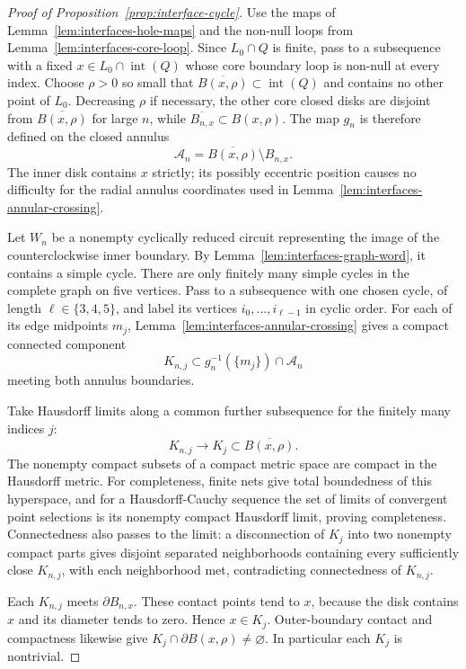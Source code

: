 \begin{proof}[Proof of Proposition~\ref{prop:interface-cycle}]
Use the maps of Lemma~\ref{lem:interfaces-hole-maps} and the
non-null loops from Lemma~\ref{lem:interfaces-core-loop}.
Since $L_0\cap Q$ is finite, pass to a subsequence with a fixed
$x\in L_0\cap\operatorname{int}(Q)$ whose core boundary loop
is non-null at every index.  Choose $\rho>0$ so small that
$\overline{B(x,\rho)}\subset\operatorname{int}(Q)$ and contains no
other point of $L_0$.  Decreasing $\rho$ if necessary, the other
core closed disks are disjoint from $\overline{B(x,\rho)}$ for
large $n$, while
$\overline{B_{n,x}}\subset B(x,\rho)$.  The map $g_n$ is therefore
defined on the closed annulus
\[
 \mathcal A_n=\overline{B(x,\rho)}\setminus B_{n,x}.
\]
The inner disk contains $x$ strictly; its possibly eccentric
position causes no difficulty for the radial annulus coordinates
used in Lemma~\ref{lem:interfaces-annular-crossing}.

Let $W_n$ be a nonempty cyclically reduced circuit representing the
image of the counterclockwise inner boundary.  By
Lemma~\ref{lem:interfaces-graph-word}, it contains a simple cycle.
There are only finitely many simple cycles in the complete graph
on five vertices.  Pass to a subsequence with one chosen cycle,
of length $\ell\in\{3,4,5\}$, and label its vertices
$i_0,\ldots,i_{\ell-1}$ in cyclic order.  For each of its edge
midpoints $m_j$, Lemma~\ref{lem:interfaces-annular-crossing} gives
a compact connected component
\[
 K_{n,j}\subset g_n^{-1}(\{m_j\})\cap\mathcal A_n
\]
meeting both annulus boundaries.

Take Hausdorff limits along a common further subsequence for the
finitely many indices $j$:
\[
 K_{n,j}\longrightarrow K_j\subset\overline{B(x,\rho)}.
\]
The nonempty compact subsets of a compact metric space are compact
in the Hausdorff metric.  For completeness, finite nets give total
boundedness of this hyperspace, and for a Hausdorff-Cauchy sequence
the set of limits of convergent point selections is its nonempty
compact Hausdorff limit, proving completeness.  Connectedness also
passes to the limit: a disconnection of $K_j$ into two nonempty
compact parts gives disjoint separated neighborhoods containing
every sufficiently close $K_{n,j}$, with each neighborhood met,
contradicting connectedness of $K_{n,j}$.

Each $K_{n,j}$ meets $\partial B_{n,x}$.  These contact points tend
to $x$, because the disk contains $x$ and its diameter tends to
zero.  Hence $x\in K_j$.  Outer-boundary contact and compactness
likewise give $K_j\cap\partial B(x,\rho)\ne\varnothing$.
In particular each $K_j$ is nontrivial.


\end{proof}
